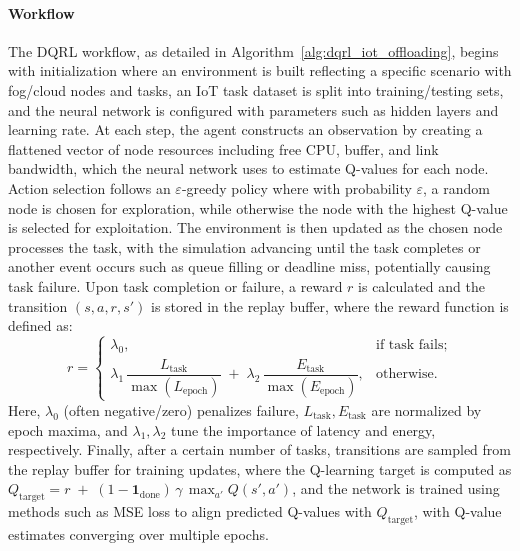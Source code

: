 \documentclass[preprint,12pt]{elsarticle}
\begin{document}
\paragraph{Workflow}
The DQRL workflow, as detailed in Algorithm~\ref{alg:dqrl_iot_offloading}, begins with initialization where an environment is built reflecting a specific scenario with fog/cloud nodes and tasks, an IoT task dataset is split into training/testing sets, and the neural network is configured with parameters such as hidden layers and learning rate. At each step, the agent constructs an observation by creating a flattened vector of node resources including free CPU, buffer, and link bandwidth, which the neural network uses to estimate Q-values for each node. Action selection follows an \(\varepsilon\)-greedy policy where with probability \(\varepsilon\), a random node is chosen for exploration, while otherwise the node with the highest Q-value is selected for exploitation. The environment is then updated as the chosen node processes the task, with the simulation advancing until the task completes or another event occurs such as queue filling or deadline miss, potentially causing task failure. Upon task completion or failure, a reward \(r\) is calculated and the transition \((s,a,r,s')\) is stored in the replay buffer, where the reward function is defined as:
\[
\textit{r} = 
\begin{cases}
\lambda_0, & \text{if task fails};\\[4pt]
\lambda_1 \,\dfrac{L_{\text{task}}}{\max(L_{\text{epoch}})} 
\;+\;
\lambda_2 \,\dfrac{E_{\text{task}}}{\max(E_{\text{epoch}})},
& \text{otherwise}.
\end{cases}
\]
Here, \(\lambda_0\) (often negative/zero) penalizes failure, \(L_{\text{task}}, E_{\text{task}}\) are normalized by epoch maxima, and \(\lambda_1, \lambda_2\) tune the importance of latency and energy, respectively. Finally, after a certain number of tasks, transitions are sampled from the replay buffer for training updates, where the Q-learning target is computed as \(Q_{\text{target}} = r \;+\; (1 - \mathbf{1}_{\text{done}})\,\gamma\, \max_{a'} Q(s',a')\), and the network is trained using methods such as MSE loss to align predicted Q-values with \(Q_{\text{target}}\), with Q-value estimates converging over multiple epochs.
\end{document}
